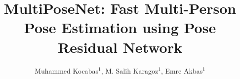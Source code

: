 \documentclass[runningheads]{llncs}
\begin{document}
\pagestyle{headings}
\mainmatter
\def\ECCV18SubNumber{757}  %




\title{MultiPoseNet: Fast Multi-Person Pose Estimation using Pose Residual Network} 




\titlerunning{ }
\authorrunning{ }




\author{Muhammed Kocabas$^1$, M. Salih Karagoz$^1$, Emre Akbas$^1$}




\maketitle
\end{document}
